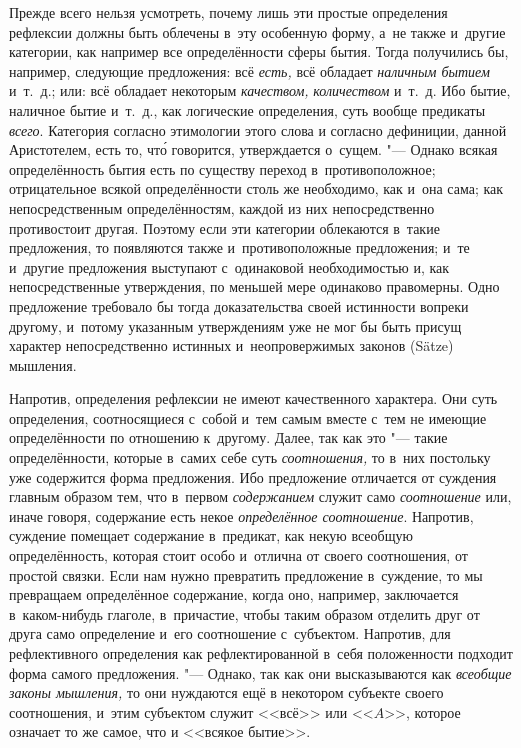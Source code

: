 Прежде всего нельзя усмотреть, почему лишь эти простые определения рефлексии
должны быть облечены в~эту особенную форму, а~не также и~другие категории,
как например все определённости сферы бытия. Тогда получились бы, например,
следующие предложения: всё {\em есть,} всё обладает
{\em наличным бытием} и~т.~д.; или: всё обладает некоторым {\em качеством,}
{\em количеством} и~т.~д. Ибо бытие, наличное бытие
и~т.~д., как логические определения, суть вообще предикаты
{\em всего}. Категория согласно этимологии этого слова
и согласно дефиниции, данной Аристотелем, есть то, чт\'{о} говорится,
утверждается о~сущем. "--- Однако всякая определённость бытия есть по существу
переход в~противоположное; отрицательное всякой определённости столь же
необходимо, как и~она сама; как непосредственным определённостям, каждой из
них непосредственно противостоит другая. Поэтому если эти категории
облекаются в~такие предложения, то появляются также и~противоположные
предложения; и~те и~другие предложения выступают с~одинаковой
необходимостью и, как непосредственные утверждения, по меньшей мере
одинаково правомерны. Одно предложение требовало бы тогда доказательства
своей истинности вопреки другому, и~потому указанным утверждениям уже не
мог бы быть присущ характер непосредственно истинных и~неопровержимых
законов (Sätze) мышления.

Напротив, определения рефлексии не имеют качественного характера. Они суть
определения, соотносящиеся с~собой и~тем самым вместе с~тем не имеющие
определённости по отношению к~другому. Далее, так как это "--- такие
определённости, которые в~самих себе суть
{\em соотношения,} то в~них постольку уже содержится
форма предложения. Ибо предложение отличается от суждения главным образом
тем, что в~первом {\em содержанием} служит само
{\em соотношение} или, иначе говоря, содержание есть
некое {\em определённое соотношение}. Напротив,
суждение помещает содержание в~предикат, как некую всеобщую определённость,
которая стоит особо и~отлична от своего соотношения, от простой связки.
Если нам нужно превратить предложение в~суждение, то мы превращаем
определённое содержание, когда оно, например, заключается в~каком-нибудь
глаголе, в~причастие, чтобы таким образом отделить друг от друга само
определение и~его соотношение с~субъектом. Напротив, для рефлективного
определения как рефлектированной в~себя положенности подходит форма самого
предложения. "--- Однако, так как они высказываются как
{\em всеобщие законы мышления,} то они нуждаются ещё в
некотором субъекте своего соотношения, и~этим субъектом служит <<всё>> или
<<$A$>>, которое означает то же самое, что и <<всякое бытие>>.

